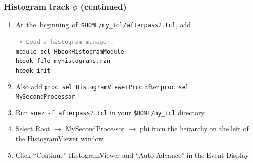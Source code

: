 \documentclass[12pt,compress]{beamer}
\begin{document}
\begin{frame}
\frametitle{Histogram track $\phi$ (continued)}

\begin{enumerate}\addtocounter{enumi}{4}\setlength{\itemsep}{0.4 cm}
\item \mbox{At the beginning of {\tt \scriptsize \$HOME/my\_tcl/afterpass2.tcl}}, add

\vspace{0.25 cm}
\hspace{0.5 cm} \begin{minipage}{0.9\linewidth}
\tt \scriptsize
\textcolor{gray}{\# Load a histogram manager.} \\
module sel HbookHistogramModule \\
hbook file myhistograms.rzn \\
hbook init
\end{minipage}

\item Also add {\tt \scriptsize proc sel HistogramViewerProc} after \mbox{\tt \scriptsize proc sel MySecondProcessor}.

\item Run {\tt suez -f afterpass2.tcl} in your {\tt \$HOME/my\_tcl} directory.

\item Select Root $\rightarrow$ MySecondProcessor $\rightarrow$ phi
from the heirarchy on the left of the HistogramViewer window

\item Click ``Continue'' HistogramViewer and ``Auto Advance'' in the Event Display

\end{enumerate}
\end{frame}
\end{document}
